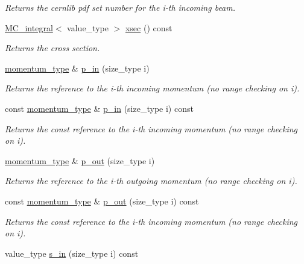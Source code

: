 \begin{DoxyCompactItemize}
\begin{DoxyCompactList}\small\item\em Returns the cernlib pdf set number for the i-\/th incoming beam. \end{DoxyCompactList}\item 
\hypertarget{a00441_a2ae209b5513c286010117df72fbd52f6}{\hyperlink{a00363}{M\-C\-\_\-integral}$<$ value\-\_\-type $>$ \hyperlink{a00441_a2ae209b5513c286010117df72fbd52f6}{xsec} () const }\label{a00441_a2ae209b5513c286010117df72fbd52f6}

\begin{DoxyCompactList}\small\item\em Returns the cross section. \end{DoxyCompactList}\item 
\hyperlink{a00559}{momentum\-\_\-type} \& \hyperlink{a00441_a088d3c3937abd672371420b0001a44f3}{p\-\_\-in} (size\-\_\-type i)
\begin{DoxyCompactList}\small\item\em Returns the reference to the i-\/th incoming momentum (no range checking on i). \end{DoxyCompactList}\item 
const \hyperlink{a00559}{momentum\-\_\-type} \& \hyperlink{a00441_a8a5e9271352f7631ce0652c22634cbfe}{p\-\_\-in} (size\-\_\-type i) const 
\begin{DoxyCompactList}\small\item\em Returns the const reference to the i-\/th incoming momentum (no range checking on i). \end{DoxyCompactList}\item 
\hyperlink{a00559}{momentum\-\_\-type} \& \hyperlink{a00441_abf9dd4563f40b5e2912e085b9b9b5f48}{p\-\_\-out} (size\-\_\-type i)
\begin{DoxyCompactList}\small\item\em Returns the reference to the i-\/th outgoing momentum (no range checking on i). \end{DoxyCompactList}\item 
const \hyperlink{a00559}{momentum\-\_\-type} \& \hyperlink{a00441_a13237d14de63e18b80517e1b1c88e7cb}{p\-\_\-out} (size\-\_\-type i) const 
\begin{DoxyCompactList}\small\item\em Returns the const reference to the i-\/th incoming momentum (no range checking on i). \end{DoxyCompactList}\item 
\hypertarget{a00441_a5aab945c0b53817ad79dac03f7a27631}{value\-\_\-type \hyperlink{a00441_a5aab945c0b53817ad79dac03f7a27631}{s\-\_\-in} (size\-\_\-type i) const }\label{a00441_a5aab945c0b53817ad79dac03f7a27631}


\end{DoxyCompactItemize}
